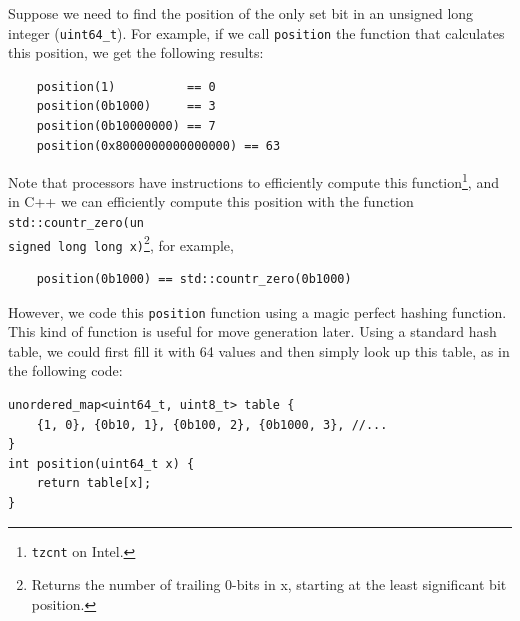 \documentclass[12pt,a4paper,twoside,openright]{book}
\begin{document}
Suppose we need to find the position of the only set bit in an unsigned long integer (\texttt{uint64_t}). For example, if we call \texttt{position} the function that calculates this position, we get the following results:

\begin{verbatim}
    position(1)          == 0
    position(0b1000)     == 3
    position(0b10000000) == 7
    position(0x8000000000000000) == 63
\end{verbatim}

Note that processors have instructions to efficiently compute this function\footnote{\texttt{tzcnt} on Intel.}, and in C++ we can efficiently compute this position with the function \texttt{std::countr_zero(un}\\\texttt{signed long long x)}\footnote{Returns the number of trailing 0-bits in x, starting at the least significant bit position.}, for example,

\begin{verbatim}
    position(0b1000) == std::countr_zero(0b1000)
\end{verbatim}

However, we code this \texttt{position} function using a magic perfect hashing function. This kind of function is useful for move generation later. Using a standard hash table, we could first fill it with 64 values and then simply look up this table, as in the following code:

\begin{verbatim}
unordered_map<uint64_t, uint8_t> table {
    {1, 0}, {0b10, 1}, {0b100, 2}, {0b1000, 3}, //...
}
int position(uint64_t x) {
    return table[x];
}
\end{verbatim}
\end{document}
